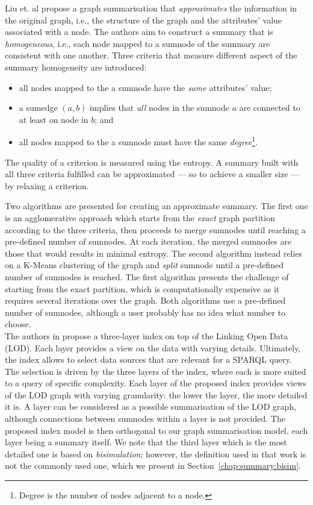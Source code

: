 Liu et. al \cite{zheng:ipsj:2011} propose a graph summarisation that \emph{approximates} the information in the original graph, i.e., the structure of the graph and the attributes' value associated with a node. The authors aim to construct a summary that is \emph{homogeneous}, i.e., each node mapped to a sumnode of the summary are consistent with one another. Three criteria that measure different aspect of the summary homogeneity are introduced:
\begin{itemize}
	\item all nodes mapped to the a sumnode have the \emph{same} attributes' value;
	\item a sumedge $(a,b)$ implies that \emph{all} nodes in the sumnode $a$ are connected to at least on node in $b$; and
	\item all nodes mapped to the a sumnode must have the same \emph{degree}\footnote{Degree is the number of nodes adjacent to a node.}.
\end{itemize}
The quality of a criterion is measured using the entropy. A summary built with all three criteria fulfilled can be approximated --- so to achieve a smaller size --- by relaxing a criterion.

Two algorithms are presented for creating an approximate summary. The first one is an agglomerative approach which starts from the \emph{exact} graph partition according to the three criteria, then proceeds to merge sumnodes until reaching a pre-defined number of sumnodes. At each iteration, the merged sumnodes are those that would results in minimal entropy. The second algorithm instead relies on a K-Means clustering of the graph and \emph{split} sumnode until a pre-defined number of sumnodes is reached. The first algorithm presents the challenge of starting from the exact partition, which is computationally expensive as it requires several iterations over the graph. Both algorithms use a pre-defined number of sumnodes, although a user probably has no idea what number to choose.\\

The authors in \cite{konrath:jws:2012} propose a three-layer index on top of the Linking Open Data (LOD). Each layer provides a view on the data with varying details. Ultimately, the index allows to select data sources that are relevant for a SPARQL query. The selection is driven by the three layers of the index, where each is more suited to a query of specific complexity.
Each layer of the proposed index provides views of the LOD graph with varying granularity: the lower the layer, the more detailed it is. A layer can be considered as a possible summarisation of the LOD graph, although connections between sumnodes within a layer is not provided. The proposed index model is then orthogonal to our graph summarisation model, each layer being a summary itself.
We note that the third layer which is the most detailed one is based on \emph{bisimulation}; however, the definition used in that work is not the commonly used one, which we present in Section~\ref{chap:summary:bisim}.

